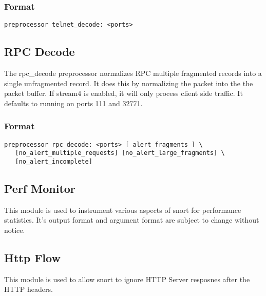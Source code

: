 \documentclass[english]{report}
\begin{document}
\subsubsection{Format}

\begin{verbatim}
preprocessor telnet_decode: <ports> 
\end{verbatim}

\subsection{RPC Decode\label{sub:RPC-Decoder}}

The rpc\_decode preprocessor normalizes RPC multiple fragmented
records into a single unfragmented record.  It does this by
normalizing the packet into the the packet buffer.  If stream4 is
enabled, it will only process client side traffic.  It defaults to
running on ports 111 and 32771.

\subsubsection{Format}

\begin{verbatim}
preprocessor rpc_decode: <ports> [ alert_fragments ] \
   [no_alert_multiple_requests] [no_alert_large_fragments] \
   [no_alert_incomplete]
\end{verbatim}


\subsection{Perf Monitor\label{sub:PerfMonitor}}

This module is used to instrument various aspects of snort for
performance statistics.  It's output format and argument format are
subject to change without notice.  

\subsection{Http Flow\label{sub:HttpFlow}}

This module is used to allow snort to ignore HTTP Server resposnes
after the HTTP headers.
\end{document}
